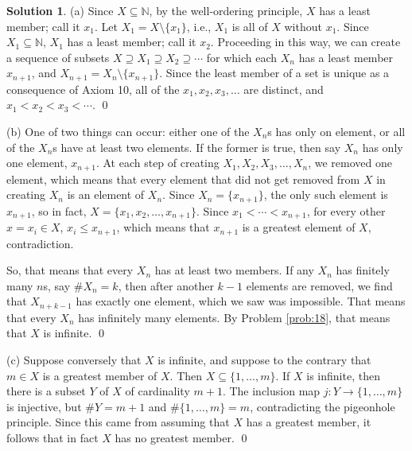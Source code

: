 \documentclass{article}
\numberwithin{equation}{section}
\theoremstyle{plain}
\theoremstyle{definition}
\newtheorem*{solution*}{Solution}
\newcommand{\N}{\mathbb N}
\begin{document}
\begin{solution*}
	(a) Since $X \subseteq \N$, by the well-ordering principle, $X$ has a least member; call it $x_1$. Let $X_1 = X \setminus \{x_1\}$, i.e., $X_1$ is all of $X$ without $x_1$. Since $X_1 \subseteq \N$, $X_1$ has a least member; call it $x_2$. Proceeding in this way, we can create a sequence of subsets $X \supseteq X_1 \supseteq X_2 \supseteq \cdots$ for which each $X_n$ has a least member $x_{n+1}$, and $X_{n+1} = X_n \setminus \{x_{n+1}\}$. Since the least member of a set is unique as a consequence of Axiom 10, all of the $x_1, x_2, x_3, \ldots$ are distinct, and $x_1 < x_2 < x_3 < \cdots$. \qed 
	
	(b) One of two things can occur: either one of the $X_n$s has only on element, or all of the $X_n$s have at least two elements. If the former is true, then say $X_n$ has only one element, $x_{n+1}$. At each step of creating $X_1, X_2, X_3, \ldots, X_n$, we removed one element, which means that every element that did not get removed from $X$ in creating $X_n$ is an element of $X_n$. Since $X_n = \{x_{n+1}\}$, the only such element is $x_{n+1}$, so in fact, $X = \{x_1, x_2, \ldots, x_{n+1}\}$. Since $x_1 < \cdots < x_{n+1}$, for every other $x = x_i \in X$, $x_i \leq x_{n+1}$, which means that $x_{n+1}$ is a greatest element of $X$, contradiction. 
	
	So, that means that every $X_n$ has at least two members. If any $X_n$ has finitely many $n$s, say $\#X_n = k$, then after another $k-1$ elements are removed, we find that $X_{n+k-1}$ has exactly one element, which we saw was impossible. That means that every $X_n$ has infinitely many elements. By Problem \ref{prob:18}, that means that $X$ is infinite. \qed 
	
	(c) Suppose conversely that $X$ is infinite, and suppose to the contrary that $m \in X$ is a greatest member of $X$. Then $X \subseteq \{1, \ldots, m\}$. If $X$ is infinite, then there is a subset $Y$ of $X$ of cardinality $m+1$. The inclusion map $j : Y \to \{1, \ldots, m\}$ is injective, but $\#Y = m+1$ and $\#\{1, \ldots, m\} = m$, contradicting the pigeonhole principle. Since this came from assuming that $X$ has a greatest member, it follows that in fact $X$ has no greatest member. \qed
\end{solution*}
\end{document}
